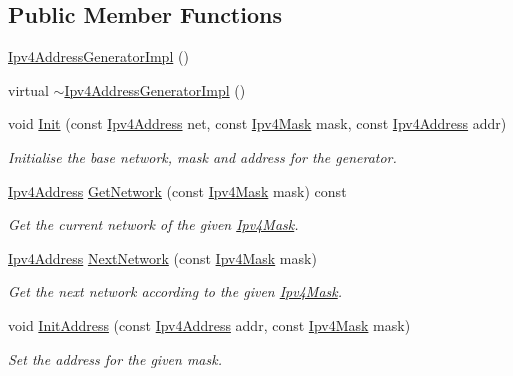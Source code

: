 \subsection*{Public Member Functions}
\begin{DoxyCompactItemize}
\item 
\hyperlink{classns3_1_1Ipv4AddressGeneratorImpl_a1ad727aeda89c70411bd51f48a8eb4bc}{Ipv4\+Address\+Generator\+Impl} ()
\item 
virtual \hyperlink{classns3_1_1Ipv4AddressGeneratorImpl_a1905af6c2edd54ef081ee69cf9be054d}{$\sim$\+Ipv4\+Address\+Generator\+Impl} ()
\item 
void \hyperlink{classns3_1_1Ipv4AddressGeneratorImpl_a48561b86bd2a9e03b4b057fd08074ac0}{Init} (const \hyperlink{classns3_1_1Ipv4Address}{Ipv4\+Address} net, const \hyperlink{classns3_1_1Ipv4Mask}{Ipv4\+Mask} mask, const \hyperlink{classns3_1_1Ipv4Address}{Ipv4\+Address} addr)
\begin{DoxyCompactList}\small\item\em Initialise the base network, mask and address for the generator. \end{DoxyCompactList}\item 
\hyperlink{classns3_1_1Ipv4Address}{Ipv4\+Address} \hyperlink{classns3_1_1Ipv4AddressGeneratorImpl_ace2fa2da17d73a800ffac8bef444cb51}{Get\+Network} (const \hyperlink{classns3_1_1Ipv4Mask}{Ipv4\+Mask} mask) const 
\begin{DoxyCompactList}\small\item\em Get the current network of the given \hyperlink{classns3_1_1Ipv4Mask}{Ipv4\+Mask}. \end{DoxyCompactList}\item 
\hyperlink{classns3_1_1Ipv4Address}{Ipv4\+Address} \hyperlink{classns3_1_1Ipv4AddressGeneratorImpl_aff19f7b39bbc6801b7ff31c56c45a9f2}{Next\+Network} (const \hyperlink{classns3_1_1Ipv4Mask}{Ipv4\+Mask} mask)
\begin{DoxyCompactList}\small\item\em Get the next network according to the given \hyperlink{classns3_1_1Ipv4Mask}{Ipv4\+Mask}. \end{DoxyCompactList}\item 
void \hyperlink{classns3_1_1Ipv4AddressGeneratorImpl_a8101796261db946932e55274a623cfb9}{Init\+Address} (const \hyperlink{classns3_1_1Ipv4Address}{Ipv4\+Address} addr, const \hyperlink{classns3_1_1Ipv4Mask}{Ipv4\+Mask} mask)
\begin{DoxyCompactList}\small\item\em Set the address for the given mask. \end{DoxyCompactList}\item 

\end{DoxyCompactItemize}
